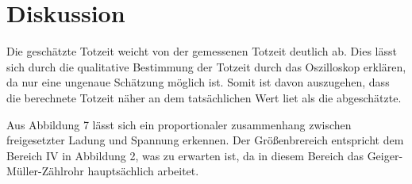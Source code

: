 \section{Diskussion}
\label{sec:Diskussion}

Die geschätzte Totzeit weicht von der gemessenen Totzeit deutlich ab. Dies lässt sich durch die qualitative
Bestimmung der Totzeit durch das Oszilloskop erklären, da nur eine ungenaue Schätzung möglich ist. Somit ist
davon auszugehen, dass die berechnete Totzeit näher an dem tatsächlichen Wert liet als die abgeschätzte.


Aus Abbildung 7 lässt sich ein proportionaler zusammenhang zwischen freigesetzter Ladung und Spannung erkennen. Der Größenbrereich entspricht
dem Bereich IV in Abbildung 2, was zu erwarten ist, da in diesem Bereich das Geiger-Müller-Zählrohr hauptsächlich arbeitet.
